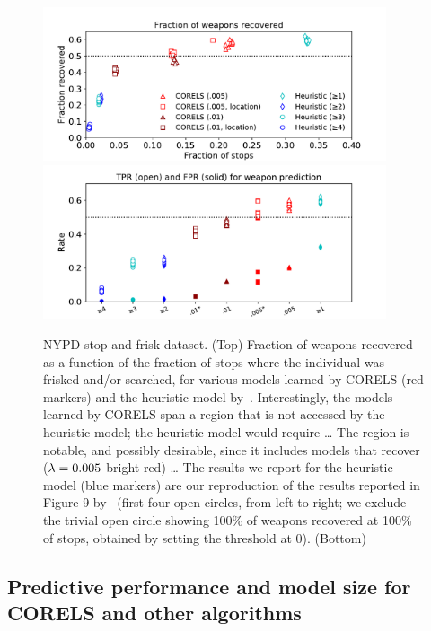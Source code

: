 \begin{figure}[t!]
\begin{center}
\includegraphics[trim={12mm, 0mm, 24mm, 5mm},
width=0.9\textwidth]{figs/cpw_folds.pdf}
\vspace{6mm}
\includegraphics[trim={12mm, 0mm, 24mm, 0mm},
width=0.9\textwidth]{figs/cpw_tpr_fpr.pdf}
\end{center}
\caption{NYPD stop-and-frisk dataset.
(Top)  Fraction of weapons recovered as a function of the fraction of stops
where the individual was frisked and/or searched,
for various models learned by CORELS (red markers) and the heuristic model by~\citet{Goel16}.
%
Interestingly, the models learned by CORELS span a region that is not accessed
by the heuristic model; the heuristic model would require \dots
%
The region is notable, and possibly desirable, since it includes models that
recover (${{\lambda} = 0.005}$ bright red) \dots
%
The results we report for the heuristic model (blue markers)
are our reproduction of the results reported in Figure 9 by~\citet{Goel16}
(first four open circles, from left to right; we exclude the trivial open circle
showing 100\% of weapons recovered at 100\% of stops, obtained by setting the threshold at 0).
(Bottom)
}
\label{fig:frisk}
\end{figure}

\subsection{Predictive performance and model size for CORELS and other algorithms}
\label{sec:sparsity}


